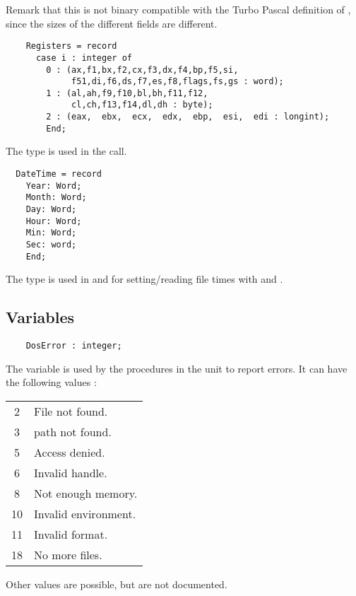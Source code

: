 Remark that this is not binary compatible with the Turbo Pascal definition
of , since the sizes of the different fields are different.
\begin{verbatim}
    Registers = record
      case i : integer of
        0 : (ax,f1,bx,f2,cx,f3,dx,f4,bp,f5,si,
             f51,di,f6,ds,f7,es,f8,flags,fs,gs : word);
        1 : (al,ah,f9,f10,bl,bh,f11,f12,
             cl,ch,f13,f14,dl,dh : byte);
        2 : (eax,  ebx,  ecx,  edx,  ebp,  esi,  edi : longint);
        End;
\end{verbatim}
The   type is used in the  call.
\begin{verbatim}
  DateTime = record
    Year: Word;
    Month: Word;
    Day: Word;
    Hour: Word;
    Min: Word;
    Sec: word;
    End;
\end{verbatim}
The  type is used in  and  for
setting/reading file times with  and .
\subsection{Variables}
\begin{verbatim}
    DosError : integer;
\end{verbatim}
The  variable is used by the procedures in the \dos unit to 
report errors. It can have the following values :
\begin{center}
\begin{tabular}{cl}
2 & File not found. \\
3 & path not found. \\
5 & Access denied. \\
6 & Invalid handle. \\
8 & Not enough memory. \\
10 & Invalid environment. \\
11 & Invalid format. \\
18 & No more files.
\end{tabular}
\end{center}
Other values are possible, but are not documented.

